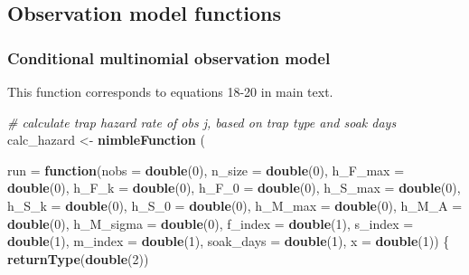 \documentclass[
]{article}
\newenvironment{Shaded}{\begin{snugshade}}{\end{snugshade}}
\newcommand{\AttributeTok}[1]{\textcolor[rgb]{0.13,0.29,0.53}{#1}}
\newcommand{\CommentTok}[1]{\textcolor[rgb]{0.56,0.35,0.01}{\textit{#1}}}
\newcommand{\ControlFlowTok}[1]{\textcolor[rgb]{0.13,0.29,0.53}{\textbf{#1}}}
\newcommand{\DecValTok}[1]{\textcolor[rgb]{0.00,0.00,0.81}{#1}}
\newcommand{\FunctionTok}[1]{\textcolor[rgb]{0.13,0.29,0.53}{\textbf{#1}}}
\newcommand{\NormalTok}[1]{#1}
\newcommand{\OtherTok}[1]{\textcolor[rgb]{0.56,0.35,0.01}{#1}}
\begin{document}
\subsection{Observation model
functions}\label{observation-model-functions}

\subsubsection{Conditional multinomial observation
model}\label{conditional-multinomial-observation-model}

This function corresponds to equations 18-20 in main text.

\begin{Shaded}
\begin{Highlighting}[]
\CommentTok{\# calculate trap hazard rate of obs j, based on trap type and soak days}
\NormalTok{calc\_hazard }\OtherTok{\textless{}{-}} \FunctionTok{nimbleFunction}\NormalTok{ (}
  
  \AttributeTok{run =} \ControlFlowTok{function}\NormalTok{(}\AttributeTok{nobs =} \FunctionTok{double}\NormalTok{(}\DecValTok{0}\NormalTok{), }\AttributeTok{n\_size =} \FunctionTok{double}\NormalTok{(}\DecValTok{0}\NormalTok{), }\AttributeTok{h\_F\_max =} \FunctionTok{double}\NormalTok{(}\DecValTok{0}\NormalTok{),}
                 \AttributeTok{h\_F\_k =} \FunctionTok{double}\NormalTok{(}\DecValTok{0}\NormalTok{), }\AttributeTok{h\_F\_0 =} \FunctionTok{double}\NormalTok{(}\DecValTok{0}\NormalTok{), }\AttributeTok{h\_S\_max =} \FunctionTok{double}\NormalTok{(}\DecValTok{0}\NormalTok{),}
                 \AttributeTok{h\_S\_k =} \FunctionTok{double}\NormalTok{(}\DecValTok{0}\NormalTok{), }\AttributeTok{h\_S\_0 =} \FunctionTok{double}\NormalTok{(}\DecValTok{0}\NormalTok{), }\AttributeTok{h\_M\_max =} \FunctionTok{double}\NormalTok{(}\DecValTok{0}\NormalTok{),}
                 \AttributeTok{h\_M\_A =} \FunctionTok{double}\NormalTok{(}\DecValTok{0}\NormalTok{), }\AttributeTok{h\_M\_sigma =} \FunctionTok{double}\NormalTok{(}\DecValTok{0}\NormalTok{), }\AttributeTok{f\_index =} \FunctionTok{double}\NormalTok{(}\DecValTok{1}\NormalTok{), }
                 \AttributeTok{s\_index =} \FunctionTok{double}\NormalTok{(}\DecValTok{1}\NormalTok{), }\AttributeTok{m\_index =} \FunctionTok{double}\NormalTok{(}\DecValTok{1}\NormalTok{), }
                 \AttributeTok{soak\_days =} \FunctionTok{double}\NormalTok{(}\DecValTok{1}\NormalTok{), }\AttributeTok{x =} \FunctionTok{double}\NormalTok{(}\DecValTok{1}\NormalTok{))}
\NormalTok{  \{}
    \FunctionTok{returnType}\NormalTok{(}\FunctionTok{double}\NormalTok{(}\DecValTok{2}\NormalTok{))}


\end{Highlighting}
\end{Shaded}
\end{document}
